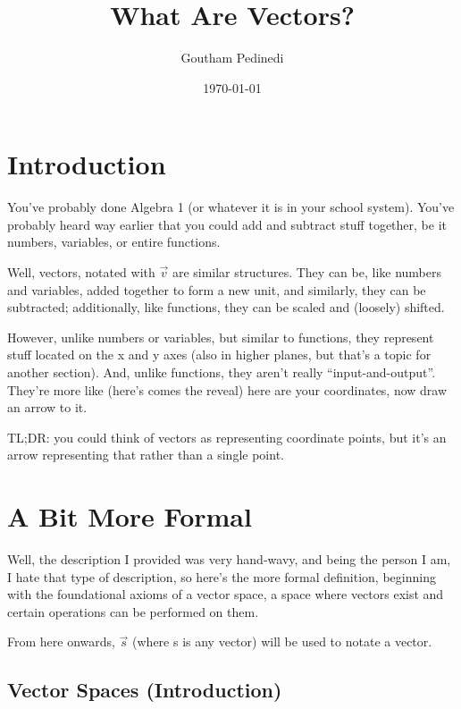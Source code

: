 \documentclass[12pt]{article}
\title{What Are Vectors?}
\author{Goutham Pedinedi}
\date{\today}
\begin{document}
\maketitle
\section{Introduction}

You've probably done Algebra 1 (or whatever it is in your school system). You've probably heard way earlier that you could add and subtract stuff together, be it numbers, variables, or entire functions.

Well, vectors, notated with $\vec{v}$ are similar structures. They can be, like numbers and variables, added together to form a new unit, and similarly, they can be subtracted; additionally, like functions, they can be scaled and (loosely) shifted.

However, unlike numbers or variables, but similar to functions, they represent stuff located on the x and y axes (also in higher planes, but that's a topic for another section). And, unlike functions, they aren't really ``input-and-output''. They're more like (here's comes the reveal) here are your coordinates, now draw an arrow to it.

TL;DR\@: you could think of vectors as representing coordinate points, but it's an arrow representing that rather than a single point.

\section{A Bit More Formal}

Well, the description I provided was very hand-wavy, and being the person I am, I hate that type of description, so here's the more formal definition, beginning with the foundational axioms of a vector space, a space where vectors exist and certain operations can be performed on them.

\begin{notebox}
    From here onwards, $\vec{s}$ (where s is any vector) will be used to notate a vector.
\end{notebox}

\subsection{Vector Spaces (Introduction)}\label{subsec:axioms}
\end{document}
